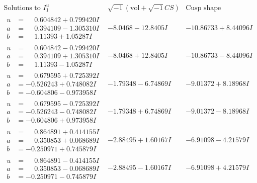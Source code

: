 \documentclass[1p]{elsarticle_modified}
\theoremstyle{definition}
\newcommand{\I}{\sqrt{-1}}
\begin{document}
$$\begin{array}{c|c|c}  
\text{Solutions to }I^u_{1}& \I (\text{vol} + \sqrt{-1}CS) & \text{Cusp shape}\\
 \hline 
\begin{aligned}
u &= \phantom{-}0.604842 + 0.799420 I \\
a &= \phantom{-}0.394109 - 1.305310 I \\
b &= \phantom{-}1.11393 + 1.05287 I\end{aligned}
 & -8.0468 - 12.8405 I & -10.86733 + 8.44096 I \\ \hline\begin{aligned}
u &= \phantom{-}0.604842 - 0.799420 I \\
a &= \phantom{-}0.394109 + 1.305310 I \\
b &= \phantom{-}1.11393 - 1.05287 I\end{aligned}
 & -8.0468 + 12.8405 I & -10.86733 - 8.44096 I \\ \hline\begin{aligned}
u &= \phantom{-}0.679595 + 0.725392 I \\
a &= -0.526243 + 0.748082 I \\
b &= -0.604806 - 0.973958 I\end{aligned}
 & -1.79348 - 6.74869 I & -9.01372 + 8.18968 I \\ \hline\begin{aligned}
u &= \phantom{-}0.679595 - 0.725392 I \\
a &= -0.526243 - 0.748082 I \\
b &= -0.604806 + 0.973958 I\end{aligned}
 & -1.79348 + 6.74869 I & -9.01372 - 8.18968 I \\ \hline\begin{aligned}
u &= \phantom{-}0.864891 + 0.414155 I \\
a &= \phantom{-}0.350853 + 0.068689 I \\
b &= -0.250971 + 0.745879 I\end{aligned}
 & -2.88495 + 1.60167 I & -6.91098 - 4.21579 I \\ \hline\begin{aligned}
u &= \phantom{-}0.864891 - 0.414155 I \\
a &= \phantom{-}0.350853 - 0.068689 I \\
b &= -0.250971 - 0.745879 I\end{aligned}
 & -2.88495 - 1.60167 I & -6.91098 + 4.21579 I \\ \hline\begin{aligned}

\end{aligned}
\end{array}$$
\end{document}
